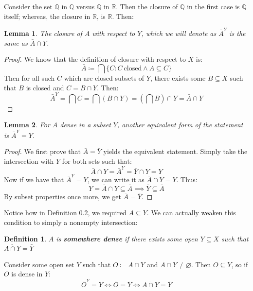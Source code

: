 \documentclass{exam}
\newtheorem{lem}{Lemma}[section]
\newtheorem{defn}{Definition}[section]
\begin{document}
Consider the set $\mathbb{Q}$ in $\mathbb{Q}$ versus $\mathbb{Q}$ in $\mathbb{R}$. Then the closure of $\mathbb{Q}$ in the first case is $\mathbb{Q}$ itself; whereas, the closure in $\mathbb{R}$, is $\mathbb{R}$. Then:
\begin{lem}
The closure of $A$ with respect to $Y$, which we will denote as $\overline{A}^Y$ is the same as $\bar{A} \cap Y$.
\end{lem}
\begin{proof}
We know that the definition of closure with respect to $X$ is:
\begin{equation*}
  \bar{A} \coloneq \bigcap \{C: C \ \text{closed} \land A \subseteq C\}
\end{equation*}
Then for all such $C$ which are closed subsets of $Y$, there exists some $B \subseteq X$ such that $B$ is closed and $C = B \cap Y$. Then:
\begin{equation*}
  \bar{A}^Y = \bigcap C = \bigcap (B \cap Y) = \left(\bigcap B\right) \cap Y = \bar{A} \cap Y
\end{equation*}
\end{proof}
\begin{lem}
For $A$ dense in a subset $Y$, another equivalent form of the statement is $\bar{A}^Y = Y$.
\end{lem}
\begin{proof}
We first prove that $\bar{A} = \bar{Y}$ yields the equivalent statement. Simply take the intersection with $Y$ for both sets such that:
\begin{equation*}
  \bar{A} \cap Y = \bar{A}^Y = \bar{Y} \cap Y = Y
\end{equation*}
Now if we have that $\bar{A}^Y = Y$, we can write it as $\bar{A} \cap Y = Y$. Thus:
\begin{equation*}
  Y = \bar{A} \cap Y \subseteq \bar{A} \implies \bar{Y} \subseteq \bar{A}
\end{equation*}
By subset properties once more, we get $\bar{A} = \bar{Y}$.
\end{proof}
Notice how in Definition 0.2, we required $A \subseteq Y$. We can actually weaken this condition to simply a nonempty intersection:
\begin{defn}
$A$ is \textbf{somewhere dense} if there exists some open $Y \subseteq X$ such that $\overline{A \cap Y} = \bar{Y}$
\end{defn}
Consider some open set $Y$ such that $O \coloneq A \cap Y$ and $A \cap Y \neq \varnothing$. Then $O \subseteq Y$, so if $O$ is dense in $Y$:
\begin{equation*}
  \bar{O}^Y = Y \iff \bar{O} = \bar{Y} \iff \overline{A \cap Y} = \bar{Y}
\end{equation*}
\end{document}
